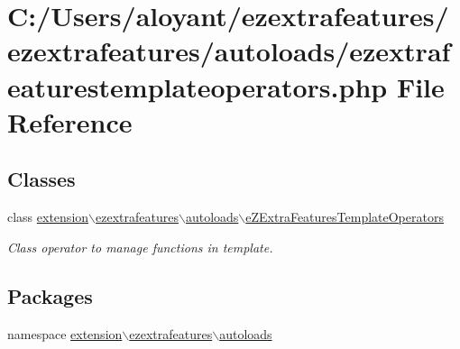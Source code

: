 \hypertarget{ezextrafeaturestemplateoperators_8php}{\section{C\-:/\-Users/aloyant/ezextrafeatures/ezextrafeatures/autoloads/ezextrafeaturestemplateoperators.php File Reference}
\label{ezextrafeaturestemplateoperators_8php}
}
\subsection*{Classes}
\begin{DoxyCompactItemize}
\item 
class \hyperlink{classextension_1_1ezextrafeatures_1_1autoloads_1_1e_z_extra_features_template_operators}{extension$\backslash$ezextrafeatures$\backslash$autoloads$\backslash$e\-Z\-Extra\-Features\-Template\-Operators}
\begin{DoxyCompactList}\small\item\em Class operator to manage functions in template. \end{DoxyCompactList}\end{DoxyCompactItemize}
\subsection*{Packages}
\begin{DoxyCompactItemize}
\item 
namespace \hyperlink{namespaceextension_1_1ezextrafeatures_1_1autoloads}{extension$\backslash$ezextrafeatures$\backslash$autoloads}
\end{DoxyCompactItemize}
